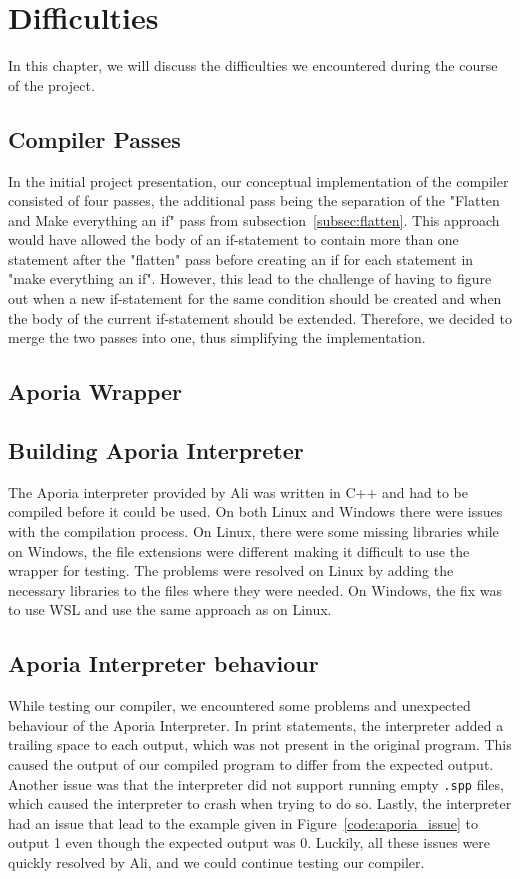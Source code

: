 \section{Difficulties}
In this chapter, we will discuss the difficulties we encountered during the course of the project.

\subsection{Compiler Passes}
In the initial project presentation, our conceptual implementation of the compiler consisted of four passes, the additional pass being the separation of the "Flatten and Make everything an if" pass from subsection~\ref{subsec:flatten}. This approach would have allowed the body of an if-statement to contain more than one statement after the "flatten" pass before creating an if for each statement in "make everything an if". However, this lead to the challenge of having to figure out when a new if-statement for the same condition should be created and when the body of the current if-statement should be extended. Therefore, we decided to merge the two passes into one, thus simplifying the implementation.

\subsection{Aporia Wrapper}

\subsection{Building Aporia Interpreter}
The Aporia interpreter provided by Ali was written in C++ and had to be compiled before it could be used. On both Linux and Windows there were issues with the compilation process. On Linux, there were some missing libraries while on Windows, the file extensions were different making it difficult to use the wrapper for testing. The problems were resolved on Linux by adding the necessary libraries to the files where they were needed. On Windows, the fix was to use WSL and use the same approach as on Linux.

\subsection{Aporia Interpreter behaviour}
While testing our compiler, we encountered some problems and unexpected behaviour of the Aporia Interpreter.
In print statements, the interpreter added a trailing space to each output, which was not present in the original program. This caused the output of our compiled program to differ from the expected output.
Another issue was that the interpreter did not support running empty \texttt{.spp} files, which caused the interpreter to crash when trying to do so.
Lastly, the interpreter had an issue that lead to the example given in Figure~\ref{code:aporia_issue} to output 1 even though the expected output was 0.
Luckily, all these issues were quickly resolved by Ali, and we could continue testing our compiler.

